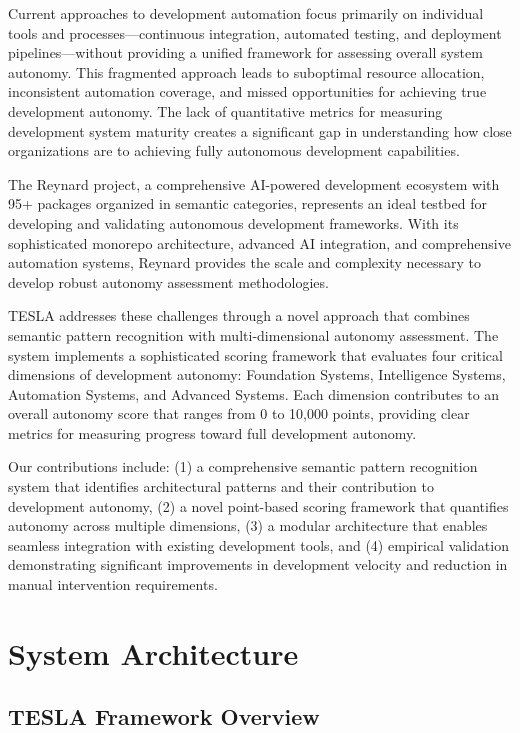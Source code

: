 \documentclass[10pt]{article}
\begin{document}
Current approaches to development automation focus primarily on individual tools and processes—continuous integration, automated testing, and deployment pipelines—without providing a unified framework for assessing overall system autonomy. This fragmented approach leads to suboptimal resource allocation, inconsistent automation coverage, and missed opportunities for achieving true development autonomy. The lack of quantitative metrics for measuring development system maturity creates a significant gap in understanding how close organizations are to achieving fully autonomous development capabilities.

The Reynard project, a comprehensive AI-powered development ecosystem with 95+ packages organized in semantic categories, represents an ideal testbed for developing and validating autonomous development frameworks. With its sophisticated monorepo architecture, advanced AI integration, and comprehensive automation systems, Reynard provides the scale and complexity necessary to develop robust autonomy assessment methodologies.

TESLA addresses these challenges through a novel approach that combines semantic pattern recognition with multi-dimensional autonomy assessment. The system implements a sophisticated scoring framework that evaluates four critical dimensions of development autonomy: Foundation Systems, Intelligence Systems, Automation Systems, and Advanced Systems. Each dimension contributes to an overall autonomy score that ranges from 0 to 10,000 points, providing clear metrics for measuring progress toward full development autonomy.

Our contributions include: (1) a comprehensive semantic pattern recognition system that identifies architectural patterns and their contribution to development autonomy, (2) a novel point-based scoring framework that quantifies autonomy across multiple dimensions, (3) a modular architecture that enables seamless integration with existing development tools, and (4) empirical validation demonstrating significant improvements in development velocity and reduction in manual intervention requirements.

\section{System Architecture}

\subsection{TESLA Framework Overview}
\end{document}
